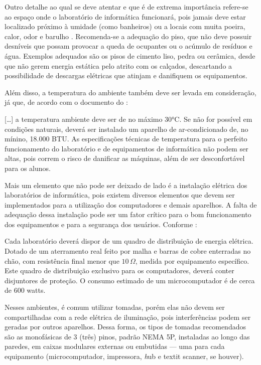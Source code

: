 \documentclass[12pt, openright, oneside, a4paper, brazil]{abntex2}
\begin{document}
	Outro detalhe ao qual se deve atentar e que é de extrema importância refere-se ao espaço onde o laboratório de informática funcionará, pois jamais deve estar localizado próximo à umidade (como banheiros) ou a locais com muita poeira, calor, odor e barulho . Recomenda-se a adequação do piso, que não deve possuir desníveis que possam provocar a queda de ocupantes ou o acúmulo de resíduos e água. Exemplos adequados são os pisos de cimento liso, pedra ou cerâmica, desde que não gerem energia estática pelo atrito com os calçados, descartando a possibilidade de descargas elétricas que atinjam e danifiquem os equipamentos.

Além disso, a temperatura do ambiente também deve ser levada em consideração, já que, de acordo com o documento do :

\begin{citacao}
		{[\dots]} a temperatura ambiente deve ser de no máximo 30°C. Se não for possível em condições naturais, deverá ser instalado um aparelho de ar-condicionado de, no mínino, 18.000 BTU. As especificações técnicas de temperatura para o perfeito funcionamento do laboratório e de equipamentos de informática não podem ser altas, pois correm o risco de danificar as máquinas, além de ser desconfortável para os alunos.
\end{citacao}

	Mais um elemento que não pode ser deixado de lado é a instalação elétrica dos laboratórios de informática, pois existem diversos elementos que devem ser implementados para a utilização dos computadores e demais aparelhos. A falta de adequação dessa instalação pode ser um fator crítico para o bom funcionamento dos equipamentos e para a segurança dos usuários. Conforme :

\begin{citacao}
		Cada laboratório deverá dispor de um quadro de distribuição de energia elétrica. Dotado de um aterramento real feito por malha e barras de cobre enterradas no chão, com resistência final menor que $10\,\Omega$, medida por equipamento específico. Este quadro de distribuição exclusivo para os computadores, deverá conter disjuntores de proteção. O consumo estimado de um microcomputador é de cerca de 600 watts.
\end{citacao}

	Nesses ambientes, é comum utilizar tomadas, porém elas não devem ser compartilhadas com a rede elétrica de iluminação, pois interferências podem ser geradas por outros aparelhos. Dessa forma, os tipos de tomadas recomendados são as monofásicas de 3 (três) pinos, padrão NEMA 5P, instaladas ao longo das paredes, em caixas modulares externas ou embutidas — uma para cada equipamento (microcomputador, impressora, {\textit hub} e {textit scanner}, se houver).
\end{document}
